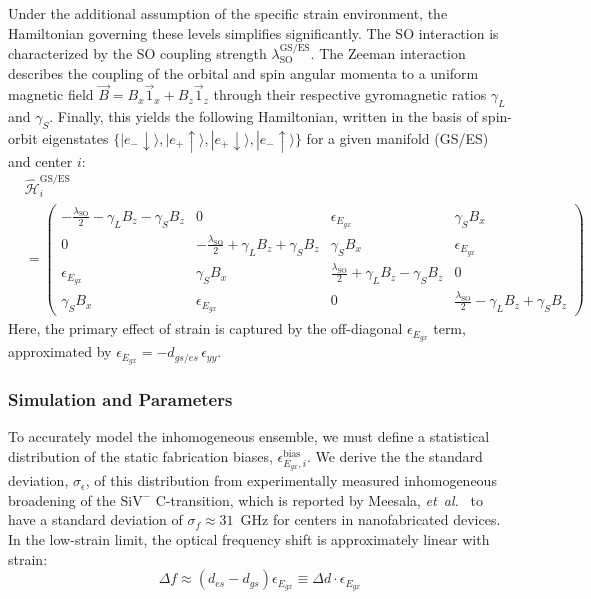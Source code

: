 Under the additional assumption of the specific strain environment, the Hamiltonian governing these levels simplifies significantly. The SO interaction is characterized by the SO coupling strength $\lambda_{\text{SO}}^{\text{GS/ES}}$. The Zeeman interaction describes the coupling of the orbital and spin angular momenta to a uniform magnetic field $\Vec{B}=B_x \Vec{1}_x + B_z \Vec{1}_z$ through their respective gyromagnetic ratios $\gamma_L$ and $\gamma_S$. Finally, this yields the following Hamiltonian, written in the basis of spin-orbit eigenstates $\{ |e_{-} \downarrow\rangle , |e_{+} \uparrow\rangle , |e_{+} \downarrow\rangle , |e_{-} \uparrow\rangle \}$ for a given manifold (GS/ES) and center $i$:
\begin{align}
 & \hat{\mathcal{H}}_i^{\text{GS/ES}} \nonumber \\
 & =
 \begin{pmatrix}
    - \frac{\lambda_{\text{SO}}}{2} - \gamma_L B_z - \gamma_S B_z & 0 & \epsilon_{E_{gx}} & \gamma_S B_x \\
    0 & - \frac{\lambda_{\text{SO}}}{2} + \gamma_L B_z + \gamma_S B_z & \gamma_S B_x & \epsilon_{E_{gx}} \\
    \epsilon_{E_{gx}} & \gamma_S B_x & \frac{\lambda_{\text{SO}}}{2} + \gamma_L B_z - \gamma_S B_z & 0 \\
    \gamma_S B_x & \epsilon_{E_{gx}} & 0 & \frac{\lambda_{\text{SO}}}{2} - \gamma_L B_z + \gamma_S B_z 
 \end{pmatrix}
\end{align}
Here, the primary effect of strain is captured by the off-diagonal $\epsilon_{E_{gx}}$ term, approximated by $\epsilon_{E_{gx}}=- d_{gs/es}\, \epsilon_{yy}$.

\subsubsection{Simulation and Parameters}
To accurately model the inhomogeneous ensemble, we must define a statistical distribution of the static fabrication biases, $\epsilon_{E_{gx},i}^{\text{bias}}$. We derive the the standard deviation, $\sigma_\epsilon$, of this distribution from experimentally measured inhomogeneous broadening of the \(\mathrm{SiV}^{-}\) C-transition, which is reported by Meesala, \textit{et~al.}~\cite{PhysRevB.97.205444} to have a standard deviation of $\sigma_f \approx 31$~GHz for centers in nanofabricated devices. In the low-strain limit, the optical frequency shift is approximately linear with strain:
\begin{equation}
    \Delta f \approx (d_{es} - d_{gs}) \epsilon_{E_{gx}} \equiv \Delta d \cdot \epsilon_{E_{gx}}
\end{equation}

